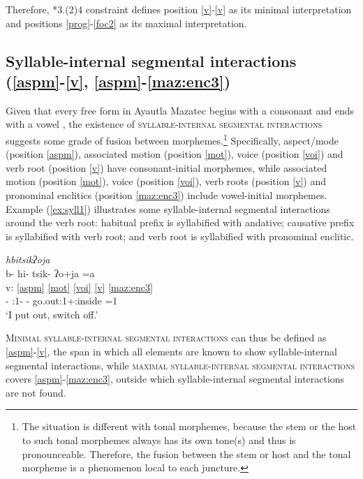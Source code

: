 \documentclass[output=paper]{langscibook}
\begin{document}
Therefore, *3.(2)4 constraint defines position \ref{v}-\ref{v} as its minimal interpretation and positions \ref{prog}-\ref{foc2} as its maximal interpretation.

\subsection{Syllable-internal segmental interactions (\ref{aspm}-\ref{v}, \ref{aspm}-\ref{maz:enc3})}\label{sec:d:syl}
Given that every free form in Ayautla Mazatec begins with a consonant and ends with a vowel \citep[cf.][83--85]{nakamoto20}, the existence of \textsc{syllable-internal segmental interactions} suggests some grade of fusion between morphemes.\footnote{The situation is different with tonal morphemes, because the stem or the host to such tonal morphemes always has its own tone(s) and thus is pronounceable. Therefore, the fusion between the stem or host and the tonal morpheme is a phenomenon local to each juncture.}
Specifically, aspect/mode (position \ref{aspm}), associated motion (position \ref{mot}), voice (position \ref{voi}) and verb root (position \ref{v}) have consonant-initial morphemes, while associated motion (position \ref{mot}), voice (position \ref{voi}), verb roots (position \ref{v}) and pronominal enclitics (position \ref{maz:enc3}) include vowel-initial morphemes. Example (\ref{ex:syll1}) illustrates some syllable-internal segmental interactions around the verb root: habitual prefix is syllabified with andative; causative prefix is syllabified with verb root; and verb root is syllabified with pronominal enclitic.

\ea\label{ex:syll1} \textit{hbi\2tsi\2kʔo\4\st{}ja\2\3\1}\\
\glll {} b- hi\2- tsi\2\ff{}k- ʔo\2\3+ja\2\3 =a\1\\
v: \ref{aspm} \ref{mot} \ref{voi} \ref{v} \ref{maz:enc3}\\
{} \Hab- \Andt:1- \Caus- go.out:1+\Pos:inside =1\Sg\\
\glt `I put out, switch off.'
\z

\textsc{Minimal syllable-internal segmental interactions} can thus be defined as \ref{aspm}-\ref{v}, the span in which all elements are known to show syllable-internal segmental interactions, while \textsc{maximal syllable-internal segmental interactions} covers \ref{aspm}-\ref{maz:enc3}, outside which syllable-internal segmental interactions are not found.
\end{document}

